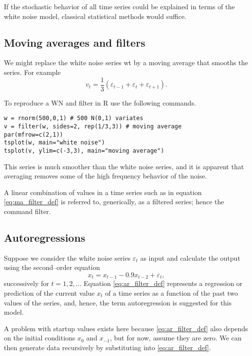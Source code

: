 \documentclass[
paper=128mm:96mm, %
fontsize=9.5pt, %
pagesize, %
parskip=half-, %
]{scrartcl} %
\theoremstyle{mythmstyle} %
\begin{document}
If the stochastic behavior of all time series could be explained in terms of the white noise model, classical statistical methods would suffice. 
\clearpage


\subsection{Moving averages and filters}
We might replace the white noise series wt by a moving average that smooths the series. For example
\begin{equation}
\label{eq:ma_filter_def}
v_t=\frac{1}{3}\left(\varepsilon_{t-1}+\varepsilon_t+\varepsilon_{t+1}\right).
\end{equation}

To reproduce a WN and filter in R use the following commands. 

\begin{lstlisting}[belowskip=-0.8 \baselineskip]
w = rnorm(500,0,1) # 500 N(0,1) variates 
v = filter(w, sides=2, rep(1/3,3)) # moving average 
par(mfrow=c(2,1))
tsplot(w, main="white noise")
tsplot(v, ylim=c(-3,3), main="moving average")
\end{lstlisting}
%
\clearpage

This series is much smoother than the white noise series, and it is apparent that averaging removes some of the high frequency behavior of the noise. 

A linear combination of values in a time series such as in equation \eqref{eq:ma_filter_def} is referred to, generically, as a filtered series; hence the command filter.
\clearpage

\subsection{Autoregressions}

Suppose we consider the white noise series $\varepsilon_t$ as input and calculate the output using the second--order equation
\begin{equation}
\label{eq:ar_filter_def}
x_t=x_{t-1}-0.9x_{t-2}+\varepsilon_{t},
\end{equation}
%
successively for $t=1,2,\dots$ Equation \eqref{eq:ar_filter_def} represents a regression or prediction of the current value $x_t$ of a time series as a function of the past two values of the series, and, hence, the term autoregression is suggested for this model. 

A problem with startup values exists here because \eqref{eq:ar_filter_def} also depends on the initial conditions $x_0$ and $x_{-1}$, but for now, assume they are zero. We can then generate data recursively by substituting into \eqref{eq:ar_filter_def}. 
\clearpage
\end{document}
